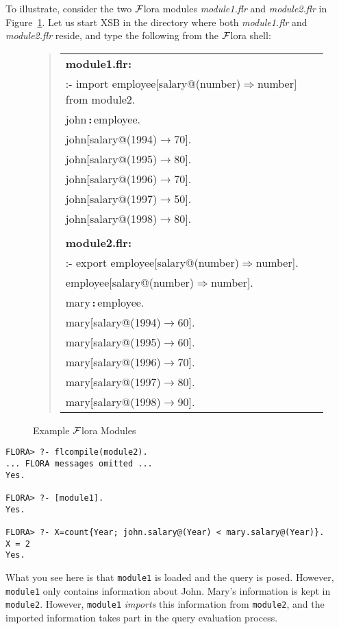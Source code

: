 \documentclass[11pt]{article}
\newcommand{\isa}{\,{\bf{:}}\,}
\newcommand{\fd}{\ensuremath{{\rightarrow}}}                   %
\newcommand{\Fd}{\ensuremath{{\Rightarrow}}}                      %
\newcommand{\FLORA}{{\mbox{${\cal F}${\sc lora}}}\xspace}
\begin{document}
To illustrate, consider the two \FLORA modules \emph{module1.flr} and
\emph{module2.flr} in Figure~\ref{fig:fig-module}.
Let us start XSB in the directory where both \emph{module1.flr} and
\emph{module2.flr} reside, and type the following from the \FLORA
shell:
\begin{figure}[htb]
\begin{quote}
\begin{tabular}{l}
{\bf module1.flr:}\vspace{3mm} \\
:- import employee[salary@(number){\Fd}number] from module2. \vspace{2mm}\\
john{\isa}employee. \\
john[salary@(1994){\fd}70]. \\
john[salary@(1995){\fd}80]. \\
john[salary@(1996){\fd}70]. \\
john[salary@(1997){\fd}50]. \\
john[salary@(1998){\fd}80]. \\
\\
{\bf module2.flr:}\vspace{3mm}
\\
:- export employee[salary@(number){\Fd}number]. \vspace{2mm}\\
employee[salary@(number){\Fd}number]. \\
mary{\isa}employee. \\
mary[salary@(1994){\fd}60]. \\
mary[salary@(1995){\fd}60]. \\
mary[salary@(1996){\fd}70]. \\
mary[salary@(1997){\fd}80]. \\
mary[salary@(1998){\fd}90].
\end{tabular}
\end{quote}
\caption{Example \FLORA Modules} \label{fig:fig-module}
\end{figure}

\begin{verbatim}
FLORA> ?- flcompile(module2).
... FLORA messages omitted ...
Yes.

FLORA> ?- [module1].
Yes.

FLORA> ?- X=count{Year; john.salary@(Year) < mary.salary@(Year)}.
X = 2
Yes.
\end{verbatim}
What you see here is that {\tt module1} is loaded and the query is posed.
However, {\tt module1} only contains information about John. Mary's
information is kept in {\tt module2}. However, {\tt module1} \emph{imports}
this information from {\tt module2}, and the imported information
takes part in the query evaluation process.
\end{document}
